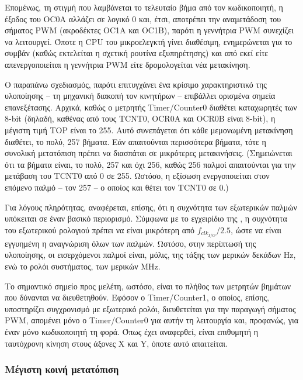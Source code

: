 Επομένως, τη στιγμή που λαμβάνεται το τελευταίο βήμα από τον κωδικοποιητή, η
έξοδος του OC0A αλλάζει σε λογικό 0 και, έτσι, αποτρέπει την αναμετάδοση του
σήματος PWM (ακροδέκτες OC1A και OC1B), παρότι η γεννήτρια PWM συνεχίζει να
λειτουργεί. Όποτε η CPU του μικροελεγκτή γίνει διαθέσιμη, ενημερώνεται για το
συμβάν (καθώς εκτελείται η σχετική ρουτίνα εξυπηρέτησης) και από εκεί είτε
απενεργοποιείται η γεννήτρια PWM είτε δρομολογείται νέα μετακίνηση.

%
%

Ο παραπάνω σχεδιασμός, παρότι επιτυγχάνει ένα κρίσιμο χαρακτηριστικό της
υλοποίησης -- τη μηχανική διακοπή τον κινητήρων -- επιβάλλει ορισμένα σημεία
επανεξέτασης. Αρχικά, καθώς ο μετρητής \textenglish{Timer\slash Counter0}
διαθέτει καταχωρητές των 8-bit (δηλαδή, καθένας από τους TCNT0, OCR0A και
OCR0B είναι 8-bit), η μέγιστη τιμή TOP είναι το 255. Αυτό συνεπάγεται ότι
κάθε μεμονωμένη μετακίνηση διαθέτει, το πολύ, 257 βήματα. Εάν απαιτούνται
περισσότερα βήματα, τότε η συνολική μετατόπιση πρέπει να διασπάται σε
μικρότερες μετακινήσεις. (Σημειώνεται ότι τα βήματα είναι, το πολύ, 257 και όχι
256, καθώς 256 παλμοί απαιτούνται για την μετάβαση του TCNT0 από 0 σε 255.
Ωστόσο, η εξίσωση ενεργοποιείται στον επόμενο παλμό -- τον 257 -- ο οποίος και
θέτει τον TCNT0 σε 0.)

Για λόγους πληρότητας, αναφέρεται, επίσης, ότι η συχνότητα των εξωτερικών παλμών
υπόκειται σε έναν βασικό περιορισμό. Σύμφωνα με το εγχειρίδιο της
\textcite[139--140]{atmel13}, η συχνότητα του εξωτερικού ρολογιού πρέπει να
είναι μικρότερη από $f_{clk_{I/O}}/2.5$, ώστε να είναι εγγυημένη η αναγνώριση
όλων των παλμών. Ωστόσο, στην περίπτωσή της υλοποίησης, οι εισερχόμενοι παλμοί
είναι, μόλις, της τάξης των μερικών δεκάδων Hz, ενώ το ρολόι συστήματος, των
μερικών MHz.

Το σημαντικό σημείο προς μελέτη, ωστόσο, είναι το πλήθος των μετρητών βημάτων
που δύνανται να διευθετηθούν. Εφόσον ο \textenglish{Timer\slash Counter1}, ο
οποίος, επίσης, υποστηρίζει συγχρονισμό με εξωτερικό ρολόι, διευθετείται για την
παραγωγή σήματος PWM, απομένει μόνο ο \textenglish{Timer\slash Counter0} για
αυτήν τη λειτουργία και, προφανώς, για έναν μόνο κωδικοποιητή τη φορά. Όπως έχει
αναφερθεί, είναι επιθυμητή η ταυτόχρονη κίνηση στους άξονες X και Y, όποτε αυτό
απαιτείται.


\subsubsection{Μέγιστη κοινή μετατόπιση}
\label{ssubsec:motor:common-translation}

